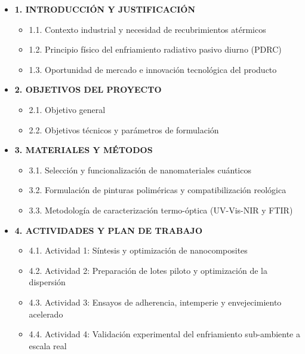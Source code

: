 \documentclass[11pt,a4paper]{article}
\begin{document}
\begin{itemize}[leftmargin=*, label={}]
    \item \textbf{1. INTRODUCCIÓN Y JUSTIFICACIÓN}
    \begin{itemize}[leftmargin=1.5em, label={}]
        \item 1.1. Contexto industrial y necesidad de recubrimientos atérmicos
        \item 1.2. Principio físico del enfriamiento radiativo pasivo diurno (PDRC)
        \item 1.3. Oportunidad de mercado e innovación tecnológica del producto
    \end{itemize}

    \vspace{0.4em}
    \item \textbf{2. OBJETIVOS DEL PROYECTO}
    \begin{itemize}[leftmargin=1.5em, label={}]
        \item 2.1. Objetivo general
        \item 2.2. Objetivos técnicos y parámetros de formulación
    \end{itemize}

    \vspace{0.4em}
    \item \textbf{3. MATERIALES Y MÉTODOS}
    \begin{itemize}[leftmargin=1.5em, label={}]
        \item 3.1. Selección y funcionalización de nanomateriales cuánticos
        \item 3.2. Formulación de pinturas poliméricas y compatibilización reológica
        \item 3.3. Metodología de caracterización termo-óptica (UV-Vis-NIR y FTIR)
    \end{itemize}

    \vspace{0.4em}
    \item \textbf{4. ACTIVIDADES Y PLAN DE TRABAJO}
    \begin{itemize}[leftmargin=1.5em, label={}]
        \item 4.1. Actividad 1: Síntesis y optimización de nanocomposites
        \item 4.2. Actividad 2: Preparación de lotes piloto y optimización de la dispersión
        \item 4.3. Actividad 3: Ensayos de adherencia, intemperie y envejecimiento acelerado
        \item 4.4. Actividad 4: Validación experimental del enfriamiento sub-ambiente a escala real
    \end{itemize}


\end{itemize}
\end{document}
